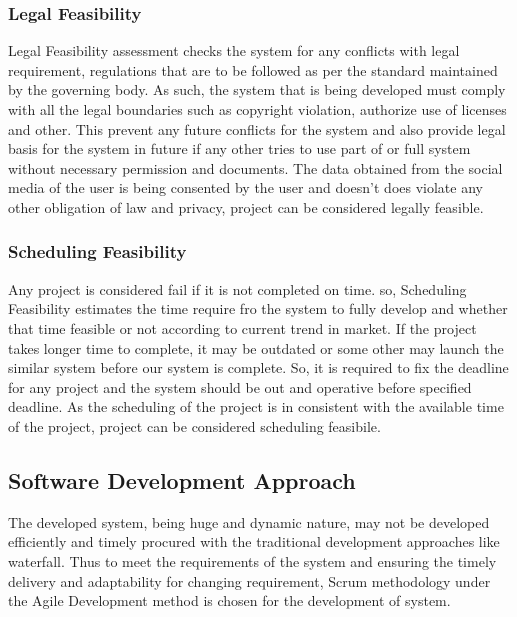 \subsubsection{Legal Feasibility}
Legal Feasibility assessment checks the system for any conflicts with legal requirement, regulations that are to be followed as per the standard maintained by the governing body. As such, the system that is being developed must comply with all the legal boundaries such as copyright violation, authorize use of licenses and other. This prevent any future conflicts for the system and also provide legal basis for the system in future if any other tries to use part of or full system without necessary permission and documents. The data obtained from the social media of the user is being consented by the user and doesn't does violate any other obligation of law and privacy, project can be considered legally feasible.

\subsubsection{Scheduling Feasibility}
Any project is considered fail if it is not completed on time. so, Scheduling Feasibility estimates the time require fro the system to fully develop and whether that time feasible or not according to current trend in market. If the project takes longer time to complete, it may be outdated or some other may launch the similar system before our system is complete. So, it is required to fix the deadline for any project and the system should be out and operative before specified deadline. As the scheduling of the project is in consistent with the available time of the project, project can be considered scheduling feasibile.

\subsection{Software Development Approach}
The developed system, being huge and dynamic nature, may not be developed efficiently and timely procured with the traditional development approaches like waterfall. Thus to meet the requirements of the system and ensuring the timely delivery and adaptability for changing requirement, Scrum methodology under the Agile Development method is chosen for the development of system.


